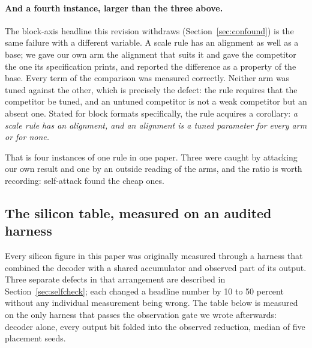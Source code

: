 \documentclass[11pt]{article}
\theoremstyle{definition}
\begin{document}
\paragraph{And a fourth instance, larger than the three above.} The block-axis
headline this revision withdraws (Section~\ref{sec:confound}) is the same failure
with a different variable. A scale rule has an alignment as well as a base; we
gave our own arm the alignment that suits it and gave the competitor the one its
specification prints, and reported the difference as a property of the base.
Every term of the comparison was measured correctly. Neither arm was tuned
against the other, which is precisely the defect: the rule requires that the
competitor be tuned, and an untuned competitor is not a weak competitor but an
absent one. Stated for block formats specifically, the rule acquires a corollary:
\emph{a scale rule has an alignment, and an alignment is a tuned parameter for
every arm or for none.}

That is four instances of one rule in one paper. Three were caught by attacking
our own result and one by an outside reading of the arms, and the ratio is worth
recording: self-attack found the cheap ones.

\subsection{The silicon table, measured on an audited harness}
\label{sec:cleantable}

Every silicon figure in this paper was originally measured through a harness that
combined the decoder with a shared accumulator and observed part of its output.
Three separate defects in that arrangement are described in
Section~\ref{sec:selfcheck}; each changed a headline number by 10 to 50 percent
without any individual measurement being wrong. The table below is measured on
the only harness that passes the observation gate we wrote afterwards: decoder
alone, every output bit folded into the observed reduction, median of five
placement seeds.
\end{document}
